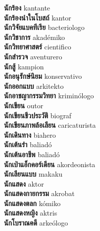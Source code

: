 \textbf{ นักร้อง  } kantante \\
\textbf{ นักร้องนำในโบสถ์  } kantor \\
\textbf{ นักวิจัยแบคทีเรีย  } bacteriologo \\
\textbf{ นักวิชาการ  } akadémiko \\
\textbf{ นักวิทยาศาสตร์  } cientifico \\
\textbf{ นักสำรวจ  } aventurero \\
\textbf{ นักสู้  } kampion \\
\textbf{ นักอนุรักษ์นิยม  } konservativo \\
\textbf{ นักออกแบบ  } arkitekto \\
\textbf{ นักอาชญากรรมวิทยา  } kriminólogo \\
\textbf{ นักเขียน  } outor \\
\textbf{ นักเขียนชีวประวัติ  } biograf \\
\textbf{ นักเขียนภาพล้อเลียน  } caricaturista \\
\textbf{ นักเดินทาง  } biahero \\
\textbf{ นักเต้นรำ  } baliadó \\
\textbf{ นักเต้นอาชีพ  } baliadó \\
\textbf{ นักเป่าแอ็กคอร์เดียน  } akordeonista \\
\textbf{ นักเลียนแบบ  } makaku \\
\textbf{ นักแสดง  } aktor \\
\textbf{ นักแสดงกายกรรม  } akrobat \\
\textbf{ นักแสดงตลก  } kómiko \\
\textbf{ นักแสดงหญิง  } aktris \\
\textbf{ นักโบราณคดี  } arkeólogo \\
